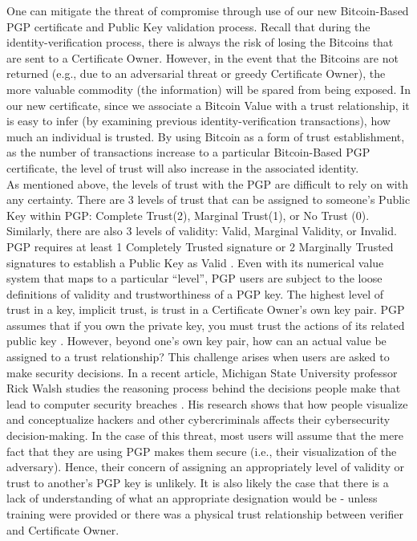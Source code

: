 \documentclass{llncs}
\begin{document}
One can mitigate the threat of compromise through use of our new Bitcoin-Based PGP certificate and Public Key validation process.  Recall that during the identity-verification process, there is always the risk of losing the Bitcoins that are sent to a Certificate Owner.  However, in the event that the Bitcoins are not returned (e.g., due to an adversarial threat or greedy Certificate Owner), the more valuable commodity (the information) will be spared from being exposed.  In our new certificate, since we associate a Bitcoin Value with a trust relationship, it is easy to infer (by examining previous identity-verification transactions), how much an individual is trusted. By using Bitcoin as a form of trust establishment, as the number of transactions increase to a particular Bitcoin-Based PGP certificate, the level of trust will also increase in the associated identity.\\
\indent As mentioned above, the levels of trust with the PGP are difficult to rely on with any certainty. There are 3 levels of trust that can be assigned to someone's Public Key within PGP: Complete Trust(2), Marginal Trust(1), or No Trust (0).  Similarly, there are also 3 levels of validity: Valid, Marginal Validity, or Invalid.  PGP requires at least 1 Completely Trusted signature or 2 Marginally Trusted signatures to establish a Public Key as Valid \cite{pgpworks}.  Even with its numerical value system that maps to a particular ``level'', PGP users are subject to the loose definitions of validity and trustworthiness of a PGP key.  The highest level of trust in a key, implicit trust, is trust in a Certificate Owner's own key pair. PGP assumes that if you own the private key, you must trust the actions of its related public key \cite{pgpworks}.  However, beyond one's own key pair, how can an actual value be assigned to a trust relationship?  This challenge arises when users are asked to make security decisions. In a recent article, Michigan State University professor Rick Walsh studies the reasoning process behind the decisions people make that lead to computer security breaches \cite{poor}.  His research shows that how people visualize and conceptualize hackers and other cybercriminals affects their cybersecurity decision-making.  In the case of this threat, most users will assume that the mere fact that they are using PGP makes them secure (i.e., their visualization of the adversary).  Hence, their concern of assigning an appropriately level of validity or trust to another's PGP key is unlikely.  It is also likely the case that there is a lack of understanding of what an appropriate designation would be - unless training were provided or there was a physical trust relationship between verifier and Certificate Owner.\\     
\end{document}
